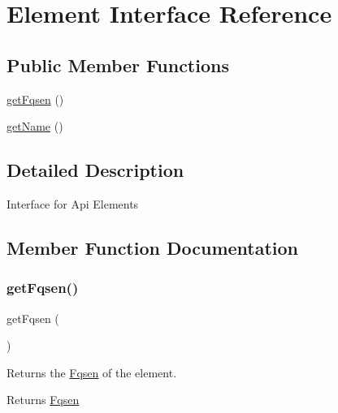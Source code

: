 \hypertarget{interfacephp_documentor_1_1_reflection_1_1_element}{}\section{Element Interface Reference}
\label{interfacephp_documentor_1_1_reflection_1_1_element}
\subsection*{Public Member Functions}
\begin{DoxyCompactItemize}
\item 
\mbox{\hyperlink{interfacephp_documentor_1_1_reflection_1_1_element_a07132fe536354352c87e6447d512bf3b}{get\+Fqsen}} ()
\item 
\mbox{\hyperlink{interfacephp_documentor_1_1_reflection_1_1_element_a3d0963e68bb313b163a73f2803c64600}{get\+Name}} ()
\end{DoxyCompactItemize}


\subsection{Detailed Description}
Interface for Api Elements 

\subsection{Member Function Documentation}
\mbox{\label{interfacephp_documentor_1_1_reflection_1_1_element_a07132fe536354352c87e6447d512bf3b}} 
\subsubsection{\texorpdfstring{get\+Fqsen()}{getFqsen()}}
{\footnotesize\ttfamily get\+Fqsen (\begin{DoxyParamCaption}{ }\end{DoxyParamCaption})}

Returns the \mbox{\hyperlink{classphp_documentor_1_1_reflection_1_1_fqsen}{Fqsen}} of the element.

\begin{DoxyReturn}{Returns}
\mbox{\hyperlink{classphp_documentor_1_1_reflection_1_1_fqsen}{Fqsen}} 
\end{DoxyReturn}
\mbox{\label{interfacephp_documentor_1_1_reflection_1_1_element_a3d0963e68bb313b163a73f2803c64600}} 
